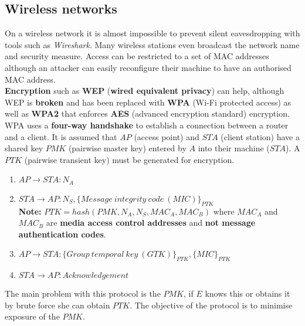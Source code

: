 \documentclass{article}
\newcommand{\np}{\vspace{8pt} \\}
\begin{document}
\subsection{Wireless networks}
On a wireless network it is almost impossible to prevent silent eavesdropping with tools such as \textit{Wireshark}. Many wireless stations even broadcast the network name and security measure. Access can be restricted to a set of MAC addresses although an attacker can easily reconfigure their machine to have an authorised MAC address. \np
\textbf{Encryption} such as \textbf{WEP} (\textbf{wired equivalent privacy}) can help, although WEP is \textbf{broken} and has been replaced with \textbf{WPA} (Wi-Fi protected access) as well as \textbf{WPA2} that enforces \textbf{AES} (advanced encryption standard) encryption. WPA uses a \textbf{four-way handshake} to establish a connection between a router and a client. It is assumed that $ AP $ (access point) and $ STA $ (client station) have a shared key $ PMK $ (pairwise master key) entered by $ A $ into their machine ($ STA $). A $ PTK $ (pairwise transient key) must be generated for encryption.
\begin{enumerate}
	\item $ AP \rightarrow STA : N_{A} $
	\item $ STA \rightarrow AP : N_{S}, \{ Message\ integrity\ code\ (MIC) \}_{PTK} $ \\
	\textbf{Note:} $ PTK = hash(PMK, N_{A}, N_{S}, MAC_{A}, MAC_{B}) $ where $ MAC_{A} $ and $ MAC_{B} $ are \textbf{media access control addresses} and \textbf{not message authentication codes}.
	\item $ AP \rightarrow STA : \{ Group\ temporal\ key\ (GTK) \}_{PTK}, \{ MIC \}_{PTK} $
	\item $ STA \rightarrow AP : Acknowledgement $
\end{enumerate}
The main problem with this protocol is the $ PMK $, if $ E $ knows this or obtains it by brute force she can obtain $ PTK $. The objective of the protocol  is to minimise exposure of the $ PMK $.
\end{document}
